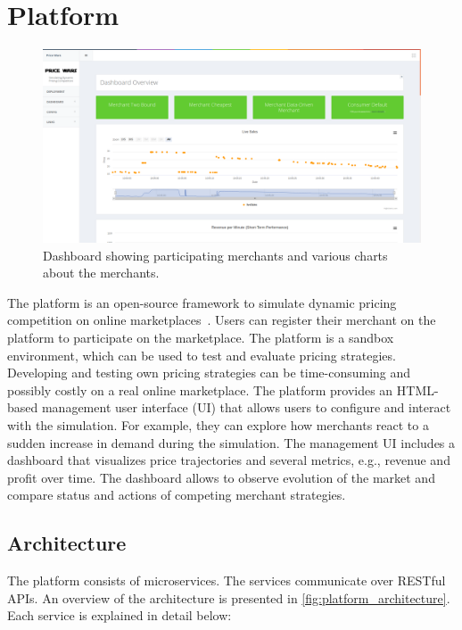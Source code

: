 
\chapter{\pricewars Platform}

\begin{figure}[h]
	\centering
	\includegraphics[width=\textwidth]{figures/dashboard}
	\caption[\pricewars Dashboard]{\pricewars Dashboard showing participating merchants and various charts about the merchants.}
	\label{fig:dashboard}
\end{figure}


The \pricewars platform is an open-source framework to simulate dynamic pricing competition on online marketplaces~\cite{DBLP:conf/recsys/0001SPSBLLSU17, edoc2017pricewars}.
Users can register their merchant on the platform to participate on the marketplace.
The platform is a sandbox environment, which can be used to test and evaluate pricing strategies. %
Developing and testing own pricing strategies can be time-consuming and possibly costly on a real online marketplace.
The platform provides an HTML-based management user interface (UI) that allows users to configure and interact with the simulation.
For example, they can explore how merchants react to a sudden increase in demand during the simulation.
The management UI includes a dashboard that visualizes price trajectories and several metrics, e.g., revenue and profit over time.
The dashboard allows to observe evolution of the market and compare status and actions of competing merchant strategies.

\section{Architecture}
The \pricewars platform consists of microservices.
The services communicate over RESTful APIs.
An overview of the architecture is presented in \cref{fig:platform_architecture}.
Each service is explained in detail below:

